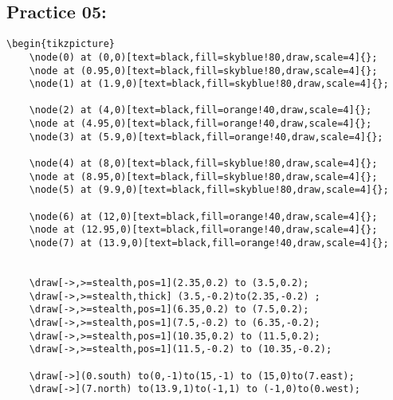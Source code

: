 \documentclass{article}
\begin{document}
		\subsection{Practice 05:}
\begin{lstlisting}
\begin{tikzpicture}
	\node(0) at (0,0)[text=black,fill=skyblue!80,draw,scale=4]{};
	\node at (0.95,0)[text=black,fill=skyblue!80,draw,scale=4]{};
	\node(1) at (1.9,0)[text=black,fill=skyblue!80,draw,scale=4]{};
			
	\node(2) at (4,0)[text=black,fill=orange!40,draw,scale=4]{};
	\node at (4.95,0)[text=black,fill=orange!40,draw,scale=4]{};
	\node(3) at (5.9,0)[text=black,fill=orange!40,draw,scale=4]{};
			
	\node(4) at (8,0)[text=black,fill=skyblue!80,draw,scale=4]{};
	\node at (8.95,0)[text=black,fill=skyblue!80,draw,scale=4]{};
	\node(5) at (9.9,0)[text=black,fill=skyblue!80,draw,scale=4]{};
			
	\node(6) at (12,0)[text=black,fill=orange!40,draw,scale=4]{};
	\node at (12.95,0)[text=black,fill=orange!40,draw,scale=4]{};
	\node(7) at (13.9,0)[text=black,fill=orange!40,draw,scale=4]{};
			
			
	\draw[->,>=stealth,pos=1](2.35,0.2) to (3.5,0.2);
	\draw[->,>=stealth,thick] (3.5,-0.2)to(2.35,-0.2) ;
	\draw[->,>=stealth,pos=1](6.35,0.2) to (7.5,0.2);
	\draw[->,>=stealth,pos=1](7.5,-0.2) to (6.35,-0.2);
	\draw[->,>=stealth,pos=1](10.35,0.2) to (11.5,0.2);
	\draw[->,>=stealth,pos=1](11.5,-0.2) to (10.35,-0.2);
			
	\draw[->](0.south) to(0,-1)to(15,-1) to (15,0)to(7.east);
	\draw[->](7.north) to(13.9,1)to(-1,1) to (-1,0)to(0.west);
\end{lstlisting}
\end{document}
